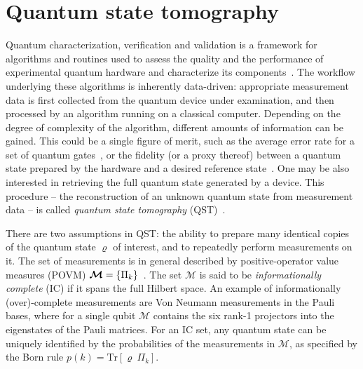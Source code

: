 \documentclass[twocolumn,english,reprint,superscriptaddress,longbibliography,pra]{revtex4-1}
\newcommand{\tr}{\textrm{Tr}}
\begin{document}
\section{Quantum state tomography}
\label{qst}
Quantum characterization, verification and validation is a framework for algorithms and routines used to assess the quality and the performance of experimental quantum hardware and characterize its components~\cite{eisert_quantum_2020}. The workflow underlying these algorithms is inherently data-driven: appropriate measurement data is first collected from the quantum device under examination, and then processed by an algorithm running on a classical computer. Depending on the degree of complexity of the algorithm, different amounts of information can be gained. This could be a single figure of merit, such as the average error rate for a set of quantum gates~\cite{PhysRevA.77.012307,PhysRevA.85.042311,PhysRevA.99.052350}, or the fidelity (or a proxy thereof) between a quantum state prepared by the hardware and a desired reference state~\cite{PhysRevLett.106.230501,aolita_reliable_2015,PhysRevLett.120.190501}. One may be also interested in retrieving the full quantum state generated by a device. This procedure -- the reconstruction of an unknown quantum state from measurement data -- is called {\it quantum state tomography} (QST)~\cite{vogel89,PhysRevA.55.R1561,PhysRevA.63.040303,PhysRevA.64.052312,Jezek2003,Blume_Kohout_2010,PhysRevLett.108.070502,Granade_2017}.

There are two assumptions in QST: the ability to prepare many identical copies of the quantum state $\bm{\varrho}$ of interest, and to repeatedly perform measurements on it. The set of measurements is in general described by positive-operator value measures (POVM)  $\linebreak\bm{\mathcal{M}}=\{\Pi_k\}$~\cite{nielsen_chuang_2010}. The set $\bm{\mathcal{M}}$ is said to be {\it informationally complete} (IC) if it spans the full Hilbert space. An example of informationally (over)-complete measurements are Von Neumann measurements in the Pauli bases, where for a single qubit $\bm{\mathcal{M}}$ contains the six rank-1 projectors into the eigenstates of the Pauli matrices. For an IC set, any quantum state can be uniquely identified by the probabilities of the measurements in $\bm{\mathcal{M}}$, as specified by the Born rule $p(k) = \tr[\bm{\varrho}\:\Pi_k]$.
\end{document}
